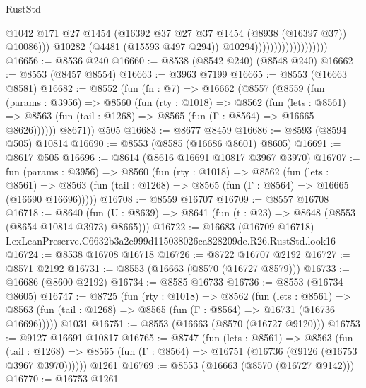 \begin{lexlean}{RustStd}
\begin{coremodule}
                                              @1042
                                              @171
                                              @27
                                              @1454
                                              (@16392
                                                @37
                                                @27
                                                @37
                                                @1454
                                                (@8938 (@16397 @37))
                                                @10086)))
                                          @10282
                                          (@4481 (@15593 @497 @294))
                                          @10294)))))))))))))))))))
@16656 := @8536 @240
@16660 := @8538 (@8542 @240) (@8548 @240)
@16662 := @8553 (@8457 @8554)
@16663 := @3963 @7199
@16665 := @8553 (@16663 @8581)
@16682 := @8552
    (fun (fn : @7) =>
    @16662
      (@8557
        (@8559
          (fun (params : @3956) =>
          @8560
            (fun (rty : @1018) =>
            @8562
              (fun (lets : @8561) =>
              @8563 (fun (tail : @1268) => @8565 (fun (Γ : @8564) => @16665 @8626))))))
        @8671))
    @505
@16683 := @8677 @8459
@16686 := @8593 (@8594 @505) @10814
@16690 := @8553 (@8585 (@16686 @8601) @8605)
@16691 := @8617 @505
@16696 := @8614 (@8616 @16691 @10817 @3967 @3970)
@16707 := fun (params : @3956) =>
  @8560
    (fun (rty : @1018) =>
    @8562
      (fun (lets : @8561) =>
      @8563 (fun (tail : @1268) => @8565 (fun (Γ : @8564) => @16665 (@16690 @16696)))))
@16708 := @8559 @16707
@16709 := @8557 @16708
@16718 := @8640
    (fun (U : @8639) => @8641 (fun (t : @23) => @8648 (@8553 (@8654 @10814 @3973) @8665)))
@16722 := @16683
    (@16709 @16718)
    LexLeanPreserve.C6632b3a2e999d115038026ca828209de.R26.RustStd.look16
@16724 := @8538 @16708 @16718
@16726 := @8722 @16707 @2192
@16727 := @8571 @2192
@16731 := @8553 (@16663 (@8570 (@16727 @8579)))
@16733 := @16686 (@8600 @2192)
@16734 := @8585 @16733
@16736 := @8553 (@16734 @8605)
@16747 := @8725
    (fun (rty : @1018) =>
    @8562
      (fun (lets : @8561) =>
      @8563 (fun (tail : @1268) => @8565 (fun (Γ : @8564) => @16731 (@16736 @16696)))))
    @1031
@16751 := @8553 (@16663 (@8570 (@16727 @9120)))
@16753 := @9127 @16691 @10817
@16765 := @8747
    (fun (lets : @8561) =>
    @8563
      (fun (tail : @1268) =>
      @8565 (fun (Γ : @8564) => @16751 (@16736 (@9126 (@16753 @3967 @3970))))))
    @1261
@16769 := @8553 (@16663 (@8570 (@16727 @9142)))
@16770 := @16753 @1261

\end{coremodule}
\end{lexlean}
